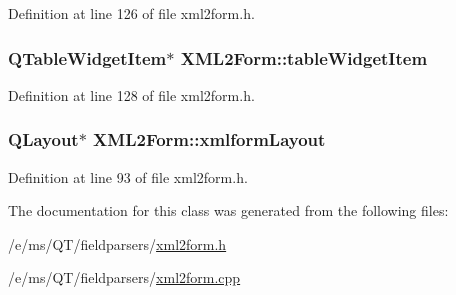 Definition at line 126 of file xml2form.h.

\hypertarget{classXML2Form_a0a01128f9b5e28a00315cb83369727ee}{
\subsubsection[{tableWidgetItem}]{\setlength{\rightskip}{0pt plus 5cm}QTableWidgetItem$\ast$ {\bf XML2Form::tableWidgetItem}}}
\label{classXML2Form_a0a01128f9b5e28a00315cb83369727ee}


Definition at line 128 of file xml2form.h.

\hypertarget{classXML2Form_ae48311c25310084db4c3847ca6d38246}{
\subsubsection[{xmlformLayout}]{\setlength{\rightskip}{0pt plus 5cm}QLayout$\ast$ {\bf XML2Form::xmlformLayout}}}
\label{classXML2Form_ae48311c25310084db4c3847ca6d38246}


Definition at line 93 of file xml2form.h.



The documentation for this class was generated from the following files:\begin{DoxyCompactItemize}
\item 
/e/ms/QT/fieldparsers/\hyperlink{xml2form_8h}{xml2form.h}\item 
/e/ms/QT/fieldparsers/\hyperlink{xml2form_8cpp}{xml2form.cpp}\end{DoxyCompactItemize}
